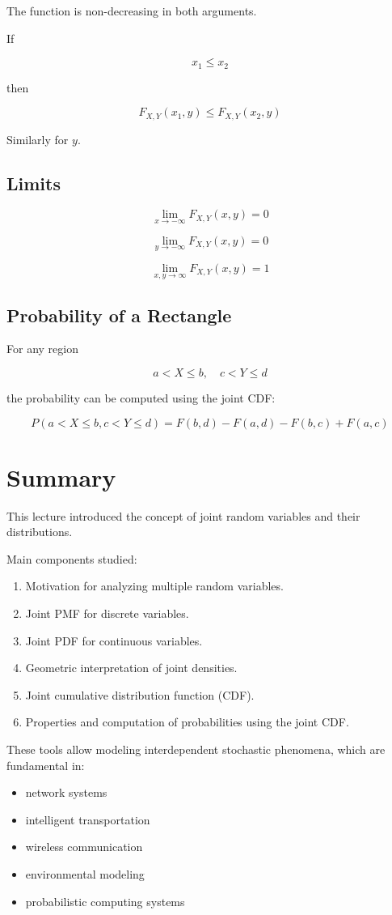 \documentclass[12pt]{article}
\begin{document}
The function is non-decreasing in both arguments.

If

\[
x_1 \le x_2
\]

then

\[
F_{X,Y}(x_1,y) \le F_{X,Y}(x_2,y)
\]

Similarly for $y$.

\subsection{Limits}

\[
\lim_{x\to -\infty} F_{X,Y}(x,y) = 0
\]

\[
\lim_{y\to -\infty} F_{X,Y}(x,y) = 0
\]

\[
\lim_{x,y\to \infty} F_{X,Y}(x,y) = 1
\]

\subsection{Probability of a Rectangle}

For any region

\[
a < X \le b, \quad c < Y \le d
\]

the probability can be computed using the joint CDF:

\[
P(a < X \le b, c < Y \le d)
=
F(b,d) - F(a,d) - F(b,c) + F(a,c)
\]

\section{Summary}

This lecture introduced the concept of joint random variables and their distributions.

Main components studied:

\begin{enumerate}
\item Motivation for analyzing multiple random variables.
\item Joint PMF for discrete variables.
\item Joint PDF for continuous variables.
\item Geometric interpretation of joint densities.
\item Joint cumulative distribution function (CDF).
\item Properties and computation of probabilities using the joint CDF.
\end{enumerate}

These tools allow modeling interdependent stochastic phenomena, which are fundamental in:

\begin{itemize}
\item network systems
\item intelligent transportation
\item wireless communication
\item environmental modeling
\item probabilistic computing systems
\end{itemize}
\end{document}
